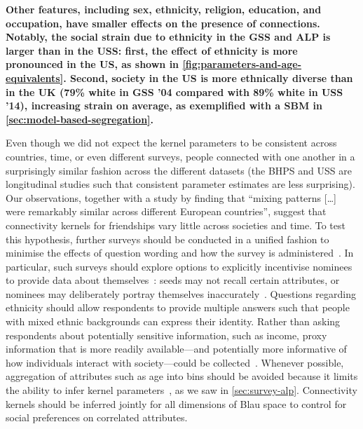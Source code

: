 \documentclass{scrartcl}
\newcommand{\change}[1]{\textbf{#1}}
\begin{document}
\begin{refsection}
\change{Other features, including sex, ethnicity, religion, education, and occupation, have smaller effects on the presence of connections. Notably, the social strain due to ethnicity in the GSS and ALP is larger than in the USS: first, the effect of ethnicity is more pronounced in the US, as shown in \cref{fig:parameters-and-age-equivalents}. Second, society in the US is more ethnically diverse than in the UK (79\% white in GSS '04 compared with 89\% white in USS '14), increasing strain on average, as exemplified with a SBM in \cref{sec:model-based-segregation}.}

Even though we did not expect the kernel parameters to be consistent across countries, time, or even different surveys, people connected with one another in a surprisingly similar fashion across the different datasets (the BHPS and USS are longitudinal studies such that consistent parameter estimates are less surprising). Our observations, together with a study by \textcite{Mossong2008} finding that ``mixing patterns [\ldots] were remarkably similar across different European countries'', suggest that connectivity kernels for friendships vary little across societies and time. To test this hypothesis, further surveys should be conducted in a unified fashion to minimise the effects of question wording and how the survey is administered~\cite{Eagle2015}. In particular, such surveys should explore options to explicitly incentivise nominees to provide data about themselves~\cite{Biernacki1981}: seeds may not recall certain attributes, or nominees may deliberately portray themselves inaccurately~\cite{Bruch2016}. Questions regarding ethnicity should allow respondents to provide multiple answers such that people with mixed ethnic backgrounds can express their identity. Rather than asking respondents about potentially sensitive information, such as income, proxy information that is more readily available---and potentially more informative of how individuals interact with society---could be collected~\cite{Po2012}. Whenever possible, aggregation of attributes such as age into bins should be avoided because it limits the ability to infer kernel parameters~\cite{Hutcheon2010}, as we saw in \cref{sec:survey-alp}. Connectivity kernels should be inferred jointly for all dimensions of Blau space to control for social preferences on correlated attributes.


\end{refsection}
\end{document}
